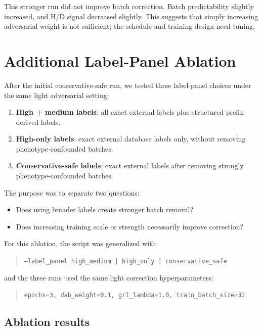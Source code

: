 \documentclass[11pt]{article}
\newcommand{\code}[1]{\texttt{\small #1}}
\begin{document}
This stronger run did not improve batch correction. Batch predictability slightly
increased, and H/D signal decreased slightly. This suggests that simply increasing
adversarial weight is not sufficient; the schedule and training design need tuning.

\section{Additional Label-Panel Ablation}

After the initial conservative-safe run, we tested three label-panel choices under the
same light adversarial setting:

\begin{enumerate}
  \item \textbf{High + medium labels}: all exact external labels plus structured
  prefix-derived labels.
  \item \textbf{High-only labels}: exact external database labels only, without removing
  phenotype-confounded batches.
  \item \textbf{Conservative-safe labels}: exact external labels after removing strongly
  phenotype-confounded batches.
\end{enumerate}

The purpose was to separate two questions:

\begin{itemize}
  \item Does using broader labels create stronger batch removal?
  \item Does increasing training scale or strength necessarily improve correction?
\end{itemize}

For this ablation, the script was generalized with:

\begin{quote}
\code{--label\_panel high\_medium | high\_only | conservative\_safe}
\end{quote}

and the three runs used the same light correction hyperparameters:

\begin{quote}
\code{epochs=3, dab\_weight=0.1, grl\_lambda=1.0, train\_batch\_size=32}
\end{quote}

\subsection{Ablation results}
\end{document}
